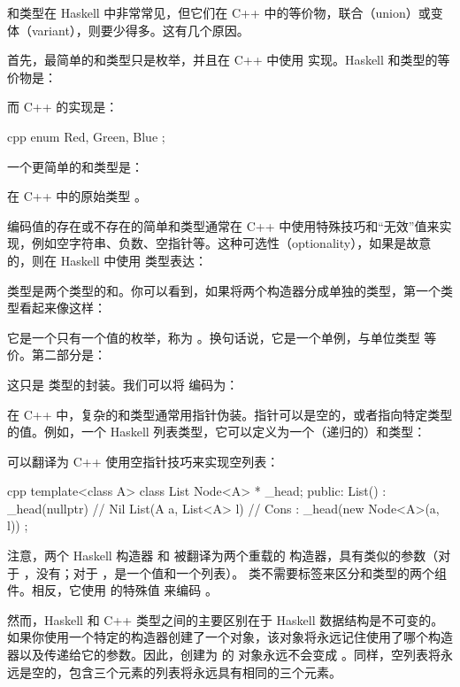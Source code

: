 和类型在 Haskell 中非常常见，但它们在 C++ 中的等价物，联合（union）或变体（variant），则要少得多。这有几个原因。

首先，最简单的和类型只是枚举，并且在 C++ 中使用  实现。Haskell 和类型的等价物是：

而 C++ 的实现是：

\begin{snip}{cpp}
  enum { Red, Green, Blue };
\end{snip}
一个更简单的和类型是：

在 C++ 中的原始类型 。

编码值的存在或不存在的简单和类型通常在 C++ 中使用特殊技巧和“无效”值来实现，例如空字符串、负数、空指针等。这种可选性（optionality），如果是故意的，则在 Haskell 中使用  类型表达：

 类型是两个类型的和。你可以看到，如果将两个构造器分成单独的类型，第一个类型看起来像这样：

它是一个只有一个值的枚举，称为 。换句话说，它是一个单例，与单位类型 \code{()} 等价。第二部分是：

这只是  类型的封装。我们可以将  编码为：

在 C++ 中，复杂的和类型通常用指针伪装。指针可以是空的，或者指向特定类型的值。例如，一个 Haskell 列表类型，它可以定义为一个（递归的）和类型：

可以翻译为 C++ 使用空指针技巧来实现空列表：

\begin{snip}{cpp}
  template<class A>
  class List {
    Node<A> * _head;
    public:
    List() : _head(nullptr) {} // Nil
    List(A a, List<A> l)       // Cons
    : _head(new Node<A>(a, l))
      {}
  };
\end{snip}
注意，两个 Haskell 构造器  和  被翻译为两个重载的  构造器，具有类似的参数（对于 ，没有；对于 ，是一个值和一个列表）。 类不需要标签来区分和类型的两个组件。相反，它使用  的特殊值  来编码 。

然而，Haskell 和 C++ 类型之间的主要区别在于 Haskell 数据结构是不可变的。如果你使用一个特定的构造器创建了一个对象，该对象将永远记住使用了哪个构造器以及传递给它的参数。因此，创建为  的  对象永远不会变成 。同样，空列表将永远是空的，包含三个元素的列表将永远具有相同的三个元素。

